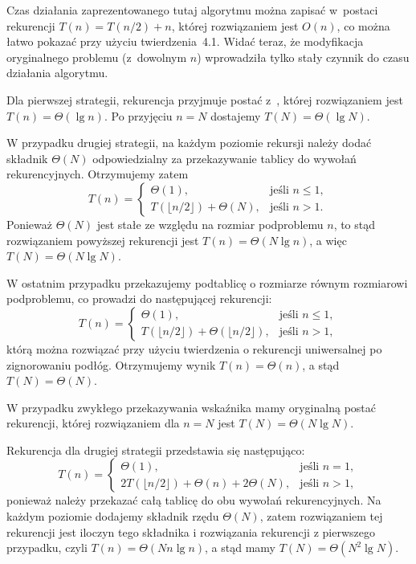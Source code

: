 Czas działania zaprezentowanego tutaj algorytmu można zapisać w~postaci rekurencji $T(n)=T(n/2)+n$, której rozwiązaniem jest $O(n)$, co można łatwo pokazać przy użyciu twierdzenia~4.1. Widać teraz, że modyfikacja oryginalnego problemu (z~dowolnym $n$) wprowadziła tylko stały czynnik do czasu działania algorytmu.


\subproblem %
Dla pierwszej strategii, rekurencja przyjmuje postać z~, której rozwiązaniem jest $T(n)=\Theta(\lg n)$. Po przyjęciu $n=N$ dostajemy $T(N)=\Theta(\lg N)$.

W przypadku drugiej strategii, na każdym poziomie rekursji należy dodać składnik $\Theta(N)$ odpowiedzialny za przekazywanie tablicy do wywołań rekurencyjnych. Otrzymujemy zatem
\[
	T(n) = \begin{cases}
		\Theta(1), & \text{jeśli $n\le1$}, \\
		T(\lfloor n/2\rfloor)+\Theta(N), & \text{jeśli $n>1$}.
	\end{cases}
\]
Ponieważ $\Theta(N)$ jest stałe ze względu na rozmiar podproblemu $n$, to stąd rozwiązaniem powyższej rekurencji jest $T(n)=\Theta(N\lg n)$, a więc $T(N)=\Theta(N\lg N)$.

W ostatnim przypadku przekazujemy podtablicę o rozmiarze równym rozmiarowi podproblemu, co prowadzi do następującej rekurencji:
\[
    T(n) = \begin{cases}
		\Theta(1), & \text{jeśli $n\le1$}, \\
		T(\lfloor n/2\rfloor)+\Theta(\lfloor n/2\rfloor), & \text{jeśli $n>1$},
	\end{cases}
\]
którą można rozwiązać przy użyciu twierdzenia o rekurencji uniwersalnej po zignorowaniu podłóg. Otrzymujemy wynik $T(n)=\Theta(n)$, a stąd $T(N)=\Theta(N)$.

\subproblem %
W przypadku zwykłego przekazywania wskaźnika mamy oryginalną postać rekurencji, której rozwiązaniem dla $n=N$ jest $T(N)=\Theta(N\lg N)$.

Rekurencja dla drugiej strategii przedstawia się następująco:
\[
	T(n) = \begin{cases}
		\Theta(1), & \text{jeśli $n=1$}, \\
		2T(\lfloor n/2\rfloor)+\Theta(n)+2\Theta(N), & \text{jeśli $n>1$},
	\end{cases}
\]
ponieważ należy przekazać całą tablicę do obu wywołań rekurencyjnych. Na każdym poziomie dodajemy składnik rzędu $\Theta(N)$, zatem rozwiązaniem tej rekurencji jest iloczyn tego składnika i rozwiązania rekurencji z pierwszego przypadku, czyli $T(n)=\Theta(Nn\lg n)$, a stąd mamy $T(N)=\Theta(N^2\lg N)$.

